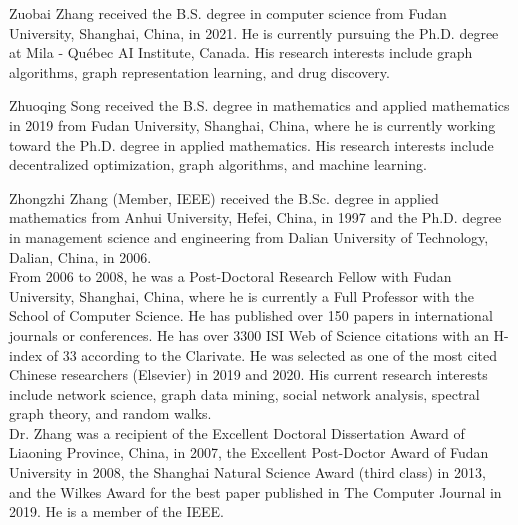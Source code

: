 \documentclass[10pt,twocolumn,twoside]{IEEEtran}
\newcommand{\biophoto}[1]{\texttt{[image: \#1]}}
\begin{document}
\begin{IEEEbiographynophoto}{Zuobai Zhang}
    received the B.S. degree  in computer science from Fudan University, Shanghai, China, in 2021. 	He is currently pursuing the Ph.D. degree at Mila - Qu\'{e}bec AI Institute, Canada. His research interests include graph algorithms, graph representation learning, and drug discovery.
\end{IEEEbiographynophoto}

\begin{IEEEbiographynophoto}{Zhuoqing Song}
    received the B.S. degree in mathematics and applied mathematics in 2019 from Fudan University, Shanghai, China, where he is currently working toward the Ph.D. degree in applied mathematics. His research interests include decentralized optimization, graph algorithms, and machine learning.
\end{IEEEbiographynophoto}

\begin{IEEEbiographynophoto}{Zhongzhi Zhang}
    (Member, IEEE) received the B.Sc. degree in applied mathematics from Anhui University, Hefei, China, in 1997 and the Ph.D. degree in management science and engineering from Dalian University of Technology, Dalian, China, in 2006. \\
    From 2006 to 2008, he was a Post-Doctoral Research Fellow with Fudan University, Shanghai, China, where he is currently a Full Professor with the School of Computer Science. He has published over 150 papers in international journals or conferences. He has over 3300 ISI Web of Science citations with an H-index of 33 according to the Clarivate. He was selected as one of the most cited Chinese researchers
    (Elsevier) in 2019 and 2020. His current research interests include network science, graph data mining, social network analysis, spectral graph theory, and random walks. \\
    Dr. Zhang was a recipient of the Excellent Doctoral Dissertation Award of Liaoning Province, China, in 2007, the Excellent Post-Doctor Award of Fudan University in 2008, the Shanghai Natural Science Award (third class) in 2013, and the Wilkes Award for the best paper published in The Computer Journal in 2019. He is a member of the IEEE.
\end{IEEEbiographynophoto}
\end{document}
